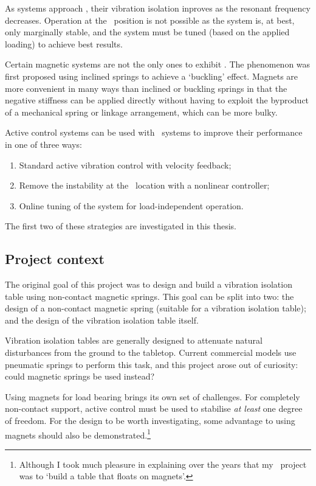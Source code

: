 As systems approach \qzs, their vibration isolation inproves as the resonant
frequency decreases. Operation at the \qzs\ position is not possible as the
system is, at best, only marginally stable, and the system must be tuned
(based on the applied loading) to achieve best results.

Certain magnetic systems are not the only ones to exhibit \qzs. The phenomenon
was first proposed using inclined springs to achieve a `buckling' effect.
Magnets are more convenient in many ways than inclined or buckling springs in
that the negative stiffness can be applied directly without having to exploit
the byproduct of a mechanical spring or linkage arrangement, which can be more
bulky.

Active control systems can be used with \qzs\ systems to improve their 
performance in one of three ways:
\begin{enumerate}
  \item Standard active vibration control with velocity feedback;
  \item Remove the instability at the \qzs\ location with a nonlinear controller;
  \item Online tuning of the system for load-independent operation.
\end{enumerate}
The first two of these strategies are investigated in this thesis.

\subsection{Project context}

The original goal of this project was to design and build a vibration
isolation table using non-contact magnetic springs. This goal can be
split into two: the design of a non-contact magnetic spring (suitable
for a vibration isolation table); and the design of the vibration
isolation table itself.

Vibration isolation tables are generally designed to attenuate natural
disturbances from the ground to the tabletop. Current commercial models use
pneumatic springs to perform this task, and this project arose out of
curiosity: could magnetic springs be used instead?

Using magnets for load bearing brings its own set of challenges. For
completely non-contact support, active control must be used to
stabilise \emph{at least} one degree of freedom. For the design to be
worth investigating, some advantage to using magnets should also be
demonstrated.\footnote{Although I took much pleasure in explaining
  over the years that my \PhD\ project was to `build a table that
  floats on magnets'.}

